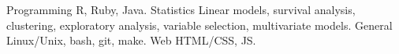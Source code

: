 


\begin{cvskills}

\cvskill
{Programming} %
{R, Ruby, Java.} %
\cvskill
{Statistics} %
{Linear models, survival analysis, clustering, exploratory analysis, 
variable selection, multivariate models.} %
\cvskill
{General} %
{Linux/Unix, bash, git, make.} %
\cvskill
{Web} %
{HTML/CSS, JS.} %

\end{cvskills}
